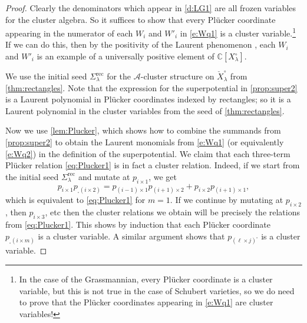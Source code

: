 \documentclass{amsart}
\theoremstyle{definition}
\numberwithin{equation}{section}
\newcommand{\rect}{\mathrm{rec}}
\newcommand{\C}{\mathbb{C}}
\newcommand{\dualSchub}{\check{X}_{\lambda}}
\newcommand{\openSchub}{{X_{\lambda}^{\circ}}}
\begin{document}
\begin{proof}
Clearly the denominators which appear in \cref{d:LG1} are all frozen variables
for the cluster algebra.  So it suffices to show that every Pl\"ucker coordinate
appearing in the numerator of each $W_i$ and $W'_i$ in \eqref{e:Wq1}
is a cluster variable.\footnote{In the case of the Grassmannian, every 
Pl\"ucker coordinate is a cluster variable, but this is not true in the 
case of Schubert varieties, so we do need to prove that the Pl\"ucker coordinates
appearing in \eqref{e:Wq1} are cluster variables!}
If we can do this,
then by the positivity of the Laurent phenomenon \cite{LeeSchiffler, GHKK}, 
each $W_i$ and $W'_i$ is an example of a universally positive element of $\C[\openSchub]$.

We use the initial seed 
	$\Sigma_{\lambda}^{\rect}$
	for the $\mathcal{A}$-cluster structure 
on 
	$\dualSchub^{\circ}$
	from \cref{thm:rectangles}.
Note that the expression for the superpotential in \cref{prop:super2}
is a Laurent polynomial in Pl\"ucker coordinates indexed by 
rectangles; so it is a Laurent polynomial in the cluster
variables from the seed of \cref{thm:rectangles}.

Now we use \cref{lem:Plucker}, which shows how to combine
the summands from \cref{prop:super2} to obtain the 
Laurent monomials from \eqref{e:Wq1} (or equivalently
\eqref{e:Wq2}) in the definition  of the 
superpotential.  We claim that each 
three-term Pl\"ucker relation \eqref{eq:Plucker1} is
in fact a cluster relation.
Indeed, if we start from the initial seed
	$\Sigma_{\lambda}^{\rect}$
	and mutate at  $p_{i \times 1}$, we get
	$$p_{i \times 1} p_{_{\square}(i \times 2)} = 
	p_{(i-1)\times 1} p_{(i+1)\times 2} + 
	p_{i \times 2} p_{(i+1)\times 1},$$
	which is equivalent to \eqref{eq:Plucker1} for $m=1$.  
	If we continue by mutating at 
	$p_{i \times 2}$, then $p_{i \times 3}$, etc then 
	the cluster relations we obtain will be precisely
	the relations from \eqref{eq:Plucker1}.  This shows
	by induction that each Pl\"ucker coordinate 
	$p_{_{\square}(i \times m)}$ is a cluster variable.
	A similar argument shows that 
	$p_{(\ell \times j)^{\square}}$ is a cluster variable.
\end{proof}
\end{document}
